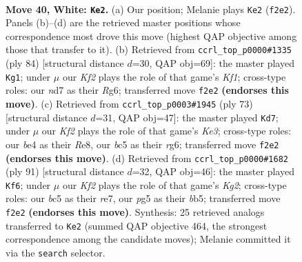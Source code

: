 \documentclass[11pt]{article}
\begin{document}
\clearpage

\begin{figure}[p]\centering
\begin{subfigure}{0.46\textwidth}\centering
\resizebox{\linewidth}{!}{%
\newchessgame
\chessboard[
  setfen={2k3n1/3n4/8/2b3p1/4b1Pp/7P/1p3K2/6r1 w - - 2 40},
  showmover=false,
  pgfstyle=straightmove, color=movearrow, markmove={f2-e2}
]}
\caption{}
\end{subfigure}\hfill
\begin{subfigure}{0.46\textwidth}\centering
\resizebox{\linewidth}{!}{%
\newchessgame
\chessboard[
  setfen={5k2/8/p5R1/P3B3/1Pb5/5p1P/7r/5K2 w - - 2 43},
  showmover=false,
  pgfstyle=straightmove, color=movearrow, markmove={f1-g1}
]}
\caption{}
\end{subfigure}
\\[4pt]
\begin{subfigure}{0.46\textwidth}\centering
\resizebox{\linewidth}{!}{%
\newchessgame
\chessboard[
  setfen={4r3/8/2p1k1R1/p6p/1P5B/2PK4/P6b/8 b - - 1 37},
  showmover=false,
  pgfstyle=straightmove, color=movearrow, markmove={e6-d7}
]}
\caption{}
\end{subfigure}\hfill
\begin{subfigure}{0.46\textwidth}\centering
\resizebox{\linewidth}{!}{%
\newchessgame
\chessboard[
  setfen={8/p3R1k1/1p6/1B4p1/1P6/2P4P/b2r4/6K1 b - - 2 46},
  showmover=false,
  pgfstyle=straightmove, color=movearrow, markmove={g7-f6}
]}
\caption{}
\end{subfigure}
\caption{\textbf{Move 40, White: \texttt{Ke2}.} (a) Our position; Melanie plays \texttt{Ke2} (\texttt{f2e2}). Panels (b)--(d) are the retrieved master positions whose correspondence most drove this move (highest QAP objective among those that transfer to it). (b) Retrieved from \texttt{ccrl\_top\_p0000\#1335} (ply 84) [structural distance $d$=30, QAP obj=69]: the master played \texttt{Kg1}; under $\mu$ our \emph{Kf2} plays the role of that game's \emph{Kf1}; cross-type roles: our \emph{n}d7 as their \emph{R}g6; transferred move \texttt{f2e2} \textbf{(endorses this move)}. (c) Retrieved from \texttt{ccrl\_top\_p0003\#1945} (ply 73) [structural distance $d$=31, QAP obj=47]: the master played \texttt{Kd7}; under $\mu$ our \emph{Kf2} plays the role of that game's \emph{Ke3}; cross-type roles: our \emph{b}e4 as their \emph{R}e8, our \emph{b}c5 as their \emph{r}g6; transferred move \texttt{f2e2} \textbf{(endorses this move)}. (d) Retrieved from \texttt{ccrl\_top\_p0000\#1682} (ply 91) [structural distance $d$=32, QAP obj=46]: the master played \texttt{Kf6}; under $\mu$ our \emph{Kf2} plays the role of that game's \emph{Kg2}; cross-type roles: our \emph{b}c5 as their \emph{r}e7, our \emph{p}g5 as their \emph{b}b5; transferred move \texttt{f2e2} \textbf{(endorses this move)}. Synthesis: 25 retrieved analogs transferred to \texttt{Ke2} (summed QAP objective 464, the strongest correspondence among the candidate moves); Melanie committed it via the \texttt{search} selector.}
\label{fig:thought-m78}
\end{figure}
\end{document}
